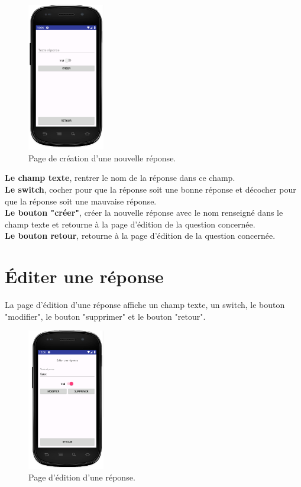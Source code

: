 \documentclass[a4paper]{report}
\begin{document}
\begin{figure}[h]
\centering
\includegraphics[width=0.3\textwidth]{newReponse.png}
\caption{\label{fig:Nouvelle réponse}Page de création d'une nouvelle réponse.}
\end{figure}

\textbf{Le champ texte}, rentrer le nom de la réponse dans ce champ. \\
\textbf{Le switch}, cocher pour que la réponse soit une bonne réponse et décocher pour que la réponse soit une mauvaise réponse. \\
\textbf{Le bouton "créer"}, créer la nouvelle réponse avec le nom renseigné dans le champ texte et retourne à la page d'édition de la question concernée. \\
\textbf{Le bouton retour}, retourne à la page d'édition de la question concernée. \\


\newpage
\section{Éditer une réponse}
La page d'édition d'une réponse affiche un champ texte, un switch, le bouton "modifier", le bouton "supprimer" et le bouton "retour".



\begin{figure}[h]
\centering
\includegraphics[width=0.3\textwidth]{editerReponse.png}
\caption{\label{fig:Éditer une réponse}Page d'édition d'une réponse.}
\end{figure}
\end{document}
